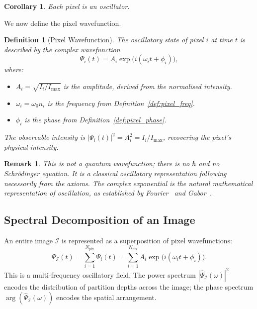 \documentclass[11pt,twocolumn,a4paper]{article}
\newtheorem{corollary}[theorem]{Corollary}
\newtheorem{definition}[theorem]{Definition}
\newtheorem{remark}[theorem]{Remark}
\begin{document}
\begin{corollary}\label{cor:pixel_oscillator}
Each pixel is an oscillator.
\end{corollary}

We now define the pixel wavefunction.

\begin{definition}[Pixel Wavefunction]\label{def:pixel_wavefunction}
The oscillatory state of pixel $i$ at time $t$ is described by the complex wavefunction
\begin{equation}
    \Psi_i(t) = A_i \exp\!\big(i(\omega_i t + \phi_i)\big),
    \label{eq:pixel_wavefunction}
\end{equation}
where:
\begin{itemize}[leftmargin=2em]
    \item $A_i = \sqrt{I_i / I_{\max}}$ is the amplitude, derived from the normalised intensity.
    \item $\omega_i = \omega_0 n_i$ is the frequency from Definition~\ref{def:pixel_freq}.
    \item $\phi_i$ is the phase from Definition~\ref{def:pixel_phase}.
\end{itemize}
The observable intensity is $|\Psi_i(t)|^2 = A_i^2 = I_i/I_{\max}$, recovering the pixel's physical intensity.
\end{definition}

\begin{remark}
This is \emph{not} a quantum wavefunction; there is no $\hbar$ and no Schr\"{o}dinger equation. It is a classical oscillatory representation following necessarily from the axioms. The complex exponential is the natural mathematical representation of oscillation, as established by Fourier~\citep{fourier1822} and Gabor~\citep{gabor1946}.
\end{remark}

\subsection{Spectral Decomposition of an Image}

An entire image $\mathcal{I}$ is represented as a superposition of pixel wavefunctions:
\begin{equation}
    \Psi_{\mathcal{I}}(t) = \sum_{i=1}^{N_{\text{pix}}} \Psi_i(t) = \sum_{i=1}^{N_{\text{pix}}} A_i \exp\!\big(i(\omega_i t + \phi_i)\big).
    \label{eq:image_wavefunction}
\end{equation}
This is a multi-frequency oscillatory field. The power spectrum $|\hat{\Psi}_{\mathcal{I}}(\omega)|^2$ encodes the distribution of partition depths across the image; the phase spectrum $\arg(\hat{\Psi}_{\mathcal{I}}(\omega))$ encodes the spatial arrangement.
\end{document}

